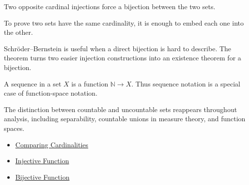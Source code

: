 \begin{remark*}[Interpretation]
Two opposite cardinal injections force a bijection between the two sets.

To prove two sets have the same cardinality, it is enough to embed each one
into the other.
\end{remark*}

\begin{remark*}[Exposition]
Schr\"{o}der--Bernstein is useful when a direct bijection is hard to describe.
The theorem turns two easier injection constructions into an existence theorem
for a bijection.
\end{remark*}

\begin{remark*}[Exposition]
A sequence in a set $X$ is a function $\mathbb{N}\to X$. Thus sequence
notation is a special case of function-space notation.
\end{remark*}

\begin{remark*}[Exposition]
The distinction between countable and uncountable sets reappears throughout
analysis, including separability, countable unions in measure theory, and
function spaces.
\end{remark*}

\begin{dependencies}
\begin{itemize}
  \item \hyperref[def:cardinality-order]{Comparing Cardinalities}
  \item \hyperref[def:injective]{Injective Function}
  \item \hyperref[def:bijective]{Bijective Function}
\end{itemize}
\end{dependencies}
